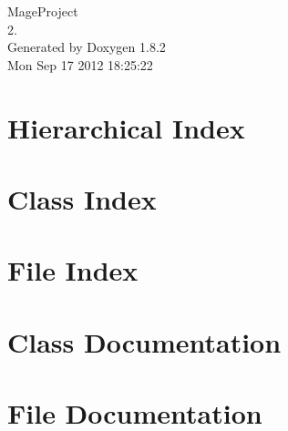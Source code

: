 \documentclass{book}
\begin{document}
\hypersetup{pageanchor=false,citecolor=blue}
\begin{titlepage}
\vspace*{7cm}
\begin{center}
{\Large Mage\-Project \\[1ex]\large 2. }\\
\vspace*{1cm}
{\large Generated by Doxygen 1.8.2}\\
\vspace*{0.5cm}
{\small Mon Sep 17 2012 18:25:22}\\
\end{center}
\end{titlepage}
\clearemptydoublepage
{}
\tableofcontents
\clearemptydoublepage
{}
\hypersetup{pageanchor=true,citecolor=blue}
\chapter{Hierarchical Index}

\chapter{Class Index}

\chapter{File Index}

\chapter{Class Documentation}
















\chapter{File Documentation}























\printindex
\end{document}
